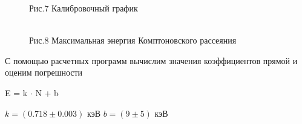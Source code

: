 \documentclass[12pt,a4paper]{article}
\begin{document}
\begin{figure}[H]
\begin{minipage}[h]{0.49\linewidth}
 Рис.7 Калибровочный график \\
\end{minipage}
\hfill
\begin{minipage}[h]{0.49\linewidth}
 \\ Рис.8 Максимальная энергия Комптоновского рассеяния
\end{minipage}
\end{figure}

С помощью расчетных программ вычислим значения коэффициентов прямой и оценим погрешности	

	
\begin{large}
E = k $\cdot$ N + b

\begin{center}
$k = (0.718 \pm 0.003) $ кэВ \;\;\;\;\;\;\;\; $b = (9 \pm 5)$ кэВ
\end{center}
\end{large}
\end{document}
